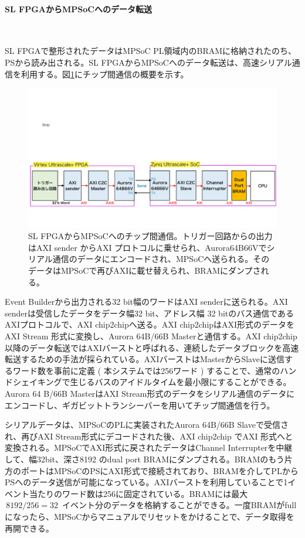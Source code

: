 \paragraph{SL FPGAからMPSoCへのデータ転送}　　
\par
SL FPGAで整形されたデータはMPSoC PL領域内のBRAMに格納されたのち、PSから読み出される。SL FPGAからMPSoCへのデータ転送は、高速シリアル通信を利用する。図\ref{C2C}にチップ間通信の概要を示す。
\begin{figure} 
\centering
\includegraphics[width=16cm]{fig/Test/C2C.pdf}
\caption[SL FPGAからMPSoCへのチップ間通信]{SL FPGAからMPSoCへのチップ間通信。トリガー回路からの出力はAXI sender からAXI プロトコルに乗せられ、Aurora64B66Vでシリアル通信のデータにエンコードされ、MPSoCへ送られる。そのデータはMPSoCで再びAXIに載せ替えられ、BRAMにダンプされる。}
\label{C2C}
\end{figure}

Event Builderから出力される32 bit幅のワードはAXI senderに送られる。AXI senderは受信したデータをデータ幅32 bit、アドレス幅 32 bitのバス通信であるAXIプロトコルで、AXI chip2chipへ送る。AXI chip2chipはAXI形式のデータをAXI Stream 形式に変換し、Aurora 64B/66B Masterと通信する。AXI chip2chip以降のデータ転送ではAXIバーストと呼ばれる、連続したデータブロックを高速転送するための手法が採られている。AXIバーストはMasterからSlaveに送信するワード数を事前に定義 ( 本システムでは256ワード ) することで、通常のハンドシェイキングで生じるバスのアイドルタイムを最小限にすることができる。
Aurora 64 B/66B MasterはAXI Stream形式のデータをシリアル通信のデータにエンコードし、ギガビットトランシーバーを用いてチップ間通信を行う。

シリアルデータは、MPSoCのPLに実装されたAurora 64B/66B Slaveで受信され、再びAXI Stream形式にデコードされた後、AXI chip2chip でAXI 形式へと変換される。MPSoCでAXI形式に戻されたデータはChannel Interrupterを中継して、幅32bit、深さ8192 のdual port BRAMにダンプされる。BRAMのもう片方のポートはMPSoCのPSにAXI形式で接続されており、BRAMを介してPLからPSへのデータ送信が可能になっている。AXIバーストを利用していることで1イベント当たりのワード数は256に固定されている。BRAMには最大$ \,8192 / 256 = 32\,$ イベント分のデータを格納することができる。一度BRAMがfullになったら、MPSoCからマニュアルでリセットをかけることで、データ取得を再開できる。

